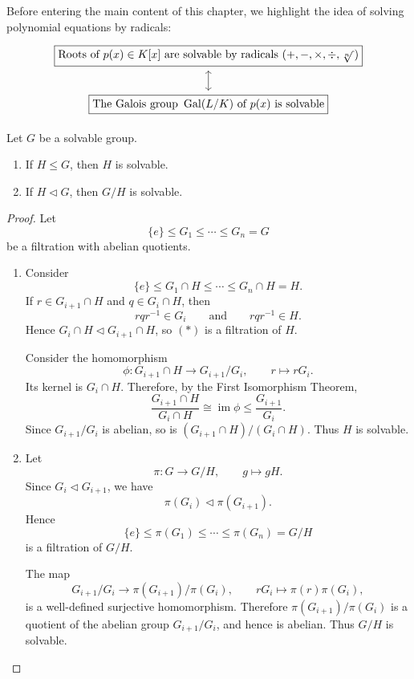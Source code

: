 Before entering the main content of this chapter, we highlight the idea of solving polynomial equations by radicals:
\[
    \begin{tikzcd}
        {\boxed{\text{Roots of }p(x)\in K[x]\text{ are solvable by radicals }(+,-,\times,\div,\sqrt[n]{\,})}} \\
        {\boxed{\text{The Galois group }\operatorname{Gal}(L/K)\text{ of }p(x)\text{ is solvable}}}
        \arrow[leftrightarrow, from=1-1, to=2-1]
    \end{tikzcd}
\]

\begin{proposition}\label{prop-subgpsolvable}
    Let $G$ be a solvable group.
    \begin{enumerate}
        \item If $H\leq G$, then $H$ is solvable.
        \item If $H\lhd G$, then $G/H$ is solvable.
    \end{enumerate}
\end{proposition}

\begin{proof}
    Let
    \[
    \{e\}\leq G_1\leq \cdots\leq G_n=G
    \]
    be a filtration with abelian quotients.

    \begin{enumerate}
        \item Consider
        \[
        \{e\}\leq G_1\cap H\leq \cdots\leq G_n\cap H=H. \tag{$*$}
        \]
        If $r\in G_{i+1}\cap H$ and $q\in G_i\cap H$, then
        \[
        rqr^{-1}\in G_i
        \qquad\text{and}\qquad
        rqr^{-1}\in H.
        \]
        Hence $G_i\cap H\lhd G_{i+1}\cap H$, so $(*)$ is a filtration of $H$.

        Consider the homomorphism
        \[
        \phi:G_{i+1}\cap H\longrightarrow G_{i+1}/G_i,
        \qquad
        r\longmapsto rG_i.
        \]
        Its kernel is $G_i\cap H$. Therefore, by the First Isomorphism Theorem,
        \[
        \frac{G_{i+1}\cap H}{G_i\cap H}
        \cong \operatorname{im}\phi
        \leq \frac{G_{i+1}}{G_i}.
        \]
        Since $G_{i+1}/G_i$ is abelian, so is
        $(G_{i+1}\cap H)/(G_i\cap H)$. Thus $H$ is solvable.

        \item Let
        \[
        \pi:G\longrightarrow G/H,
        \qquad
        g\longmapsto gH.
        \]
        Since $G_i\lhd G_{i+1}$, we have
        \[
        \pi(G_i)\lhd \pi(G_{i+1}).
        \]
        Hence
        \[
        \{e\}\leq \pi(G_1)\leq\cdots\leq \pi(G_n)=G/H
        \tag{$**$}
        \]
        is a filtration of $G/H$.

        The map
        \[
        G_{i+1}/G_i\longrightarrow \pi(G_{i+1})/\pi(G_i),
        \qquad
        rG_i\longmapsto \pi(r)\pi(G_i),
        \]
        is a well-defined surjective homomorphism. Therefore
        $\pi(G_{i+1})/\pi(G_i)$ is a quotient of the abelian group
        $G_{i+1}/G_i$, and hence is abelian. Thus $G/H$ is solvable.
    \end{enumerate}
\end{proof}

